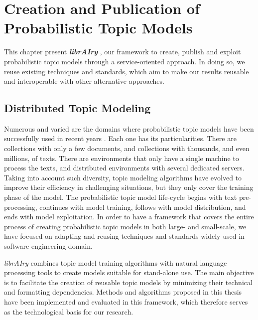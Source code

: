 

\chapter{Creation and Publication of Probabilistic Topic Models}\label{ch:scalability}

\graphicspath{{scalability/figures/}}


This chapter present \textit{\textbf{librAIry}} \citep{Badenes-Olmedo2017}, our framework to create, publish and exploit probabilistic topic models through a service-oriented approach. In doing so, we reuse existing techniques and standards, which aim to make our results reusable and interoperable with other alternative approaches.


\section{Distributed Topic Modeling}


Numerous and varied are the domains where probabilistic topic models have been successfully used in recent years \citep{TapiNzali2017, ONeill2017, Greene2016, He2017}. Each one has its particularities. There are collections with only a few documents, and collections with thousands, and even millions, of texts. There are environments that only have a single machine to process the texts, and distributed environments with several dedicated servers. Taking into account such diversity, topic modeling algorithms have evolved to improve their efficiency in challenging situations, but they only cover the training phase of the model. The probabilistic topic model life-cycle begins with text pre-processing, continues with model training, follows with model distribution, and ends with model exploitation. In order to have a framework that covers the entire process of creating probabilistic topic models in both large- and small-scale, we have focused on adapting and reusing techniques and standards widely used in software engineering domain. 

\textit{librAIry} combines topic model training algorithms with natural language processing tools to  create models suitable for stand-alone use. The main objective is to facilitate the creation of reusable topic models by minimizing their technical and formatting dependencies. Methods and algorithms proposed in this thesis have been implemented and evaluated in this framework, which therefore serves as the technological basis for our research.

